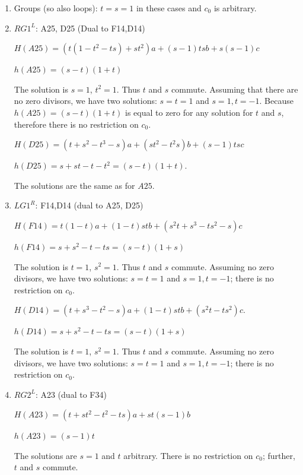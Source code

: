 \documentclass[11pt]{amsart}
\theoremstyle{definition}
\begin{document}
\begin{enumerate}
    \item[(1)]Groups (so also loops): $t=s=1$ in these cases and $c_0$ is arbitrary.
    
    \item[(2)] $RG1^L$: A25, D25    (Dual to F14,D14) 

    $H(A25) = (t(1-t^2-ts)+st^2)a+(s-1)tsb+s(s-1)c$

    $h(A25)=(s-t)(1+t)$


     The solution is $s=1$,  $t^2=1$. Thus $t$ and $s$ commute.
     Assuming that there are no zero divisors, we have two solutions: $s=t=1$ and $s=1,t=-1$. Because $h(A25)=(s-t)(1+t)$  is equal to zero for any solution for $t$ and $s$, therefore there is no restriction on $c_0$.

    
    
    
    \vspace{0.5 cm}

    

    $H(D25) = (t+s^2-t^3-s)a + (st^2 -t^2s)b +(s-1)tsc$

    $h(D25) = s+st-t-t^2=(s-t)(1+t)$.

The solutions are the same as for $A25$.

\item[(3)] $LG1^R$: F14,D14 (dual to  A25, D25)
    
    $H(F14) = t(1-t)a+(1-t)stb+(s^2t+s^3-ts^2-s)c$

    $h(F14) = s+s^2 -t -ts = (s - t)(1 + s)$

     The solution is $t=1$, $s^2=1$. Thus $t$ and $s$ commute. Assuming no zero divisors, we have two solutions: $s=t=1$ and $s=1,t=-1$; there is no restriction on $c_0$.



    $H(D14) = (t+s^3-t^2-s)a +(1-t)stb +(s^2t-ts^2)c$.

    $h(D14) = s+s^2 -t -ts = (s - t)(1 + s)$

     The solution is $t=1$, $s^2=1$. Thus $t$ and $s$ commute. Assuming no zero divisors, we have two solutions: $s=t=1$ and $s=1,t=-1$; there is no restriction on $c_0$.
    
    
\item[(4)] $RG2^L$: A23 (dual to F34)
    

    $H(A23)= (t+st^2-t^2-ts)a +st(s-1)b $

    
    $h(A23) = (s-1)t$

    The solutions are $s=1$ and  $t$ arbitrary. There is no restriction on $c_0$; further,  $t$ and $s$ commute. 
     

\end{enumerate}
\end{document}
